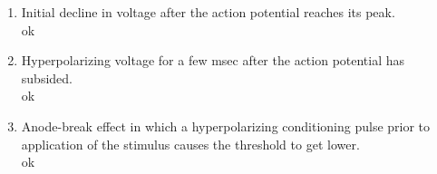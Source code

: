 \documentclass[11pt]{article}
\begin{document}
\begin{enumerate}[label=\arabic*.]
\begin{enumerate}[label=(\alph*)]
\begin{enumerate}[label=(\roman*)]
\item
Initial decline in voltage after the action potential reaches its peak.
\vspace*{1\baselineskip}
\\
ok






\item
Hyperpolarizing voltage for a few msec after the action potential has subsided.
\vspace*{1\baselineskip}
\\
ok







\item
Anode-break effect in which a hyperpolarizing conditioning pulse prior to application of the stimulus causes the threshold to get lower.
\vspace*{1\baselineskip}
\\
ok






\end{enumerate}
\end{enumerate}

































\end{enumerate}
\end{document}

